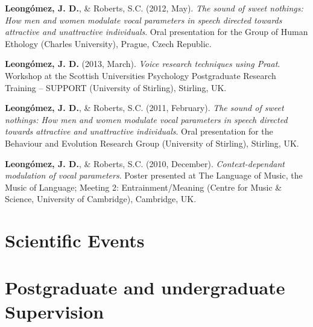 \documentclass[11pt,a4paper,]{awesome-cv}
\begin{document}
\textbf{Leongómez, J. D.}, \& Roberts, S.C. (2012, May). \emph{The sound
of sweet nothings: How men and women modulate vocal parameters in speech
directed towards attractive and unattractive individuals}. Oral
presentation for the Group of Human Ethology (Charles University),
Prague, Czech Republic.

\textbf{Leongómez, J. D.} (2013, March). \emph{Voice research techniques
using Praat}. Workshop at the Scottish Universities Psychology
Postgraduate Research Training -- SUPPORT (University of Stirling),
Stirling, UK.

\textbf{Leongómez, J. D.}, \& Roberts, S.C. (2011, February). \emph{The
sound of sweet nothings: How men and women modulate vocal parameters in
speech directed towards attractive and unattractive individuals}. Oral
presentation for the Behaviour and Evolution Research Group (University
of Stirling), Stirling, UK.

\textbf{Leongómez, J. D.}, \& Roberts, S.C. (2010, December).
\emph{Context-dependant modulation of vocal parameters}. Poster
presented at The Language of Music, the Music of Language; Meeting 2:
Entrainment/Meaning (Centre for Music \& Science, University of
Cambridge), Cambridge, UK.

\endgroup

\hypertarget{scientific-events}{%
\section{Scientific Events}\label{scientific-events}}

\begin{cventries}
\end{cventries}

\hypertarget{postgraduate-and-undergraduate-supervision}{%
\section{Postgraduate and undergraduate
Supervision}\label{postgraduate-and-undergraduate-supervision}}
\end{document}
